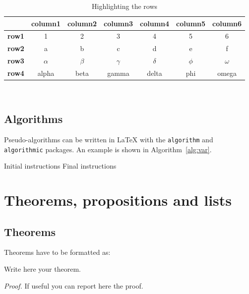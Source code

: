 \begin{table}[H]
\centering 
    \begin{tabular}{|p{3em} c c c c c c|}
    \hline
     & \textbf{column1} & \textbf{column2} & \textbf{column3} & \textbf{column4} & \textbf{column5} & \textbf{column6} \T\B \\
    \hline \hline
    \textbf{row1} & 1 & 2 & 3 & 4 & 5 & 6 \T\B\\
    \hline
    \textbf{row2} & a & b & c & d & e & f \T\B\\
    \hline
    \textbf{row3} & $\alpha$ & $\beta$ & $\gamma$ & $\delta$ & $\phi$ & $\omega$ \T\B\\
    \hline
    \textbf{row4} & alpha & beta & gamma & delta & phi & omega \B\\
    \hline
    \end{tabular}
    \\[10pt]
    \caption{Highlighting the rows}
    \label{table:exampleR}
\end{table}

\subsection{Algorithms}
\label{subsec:algorithms}

Pseudo-algorithms can be written in \LaTeX{} with the \texttt{algorithm} and \texttt{algorithmic} packages.
An example is shown in Algorithm~\ref{alg:var}.
\begin{algorithm}[H]
    \label{alg:example}
    \caption{Name of the Algorithm}
    \label{alg:var}
    \label{protocol1}
    \begin{algorithmic}[1]
    \STATE Initial instructions
    \ENDIF
    \ENDFOR
    \ENDWHILE
    \STATE Final instructions
    \end{algorithmic}
\end{algorithm} 

\vspace{5mm}

\section{Theorems, propositions and lists}

\subsection{Theorems}
Theorems have to be formatted as:
\begin{theorem}
\label{a_theorem}
Write here your theorem. 
\end{theorem}
\textit{Proof.} If useful you can report here the proof.


